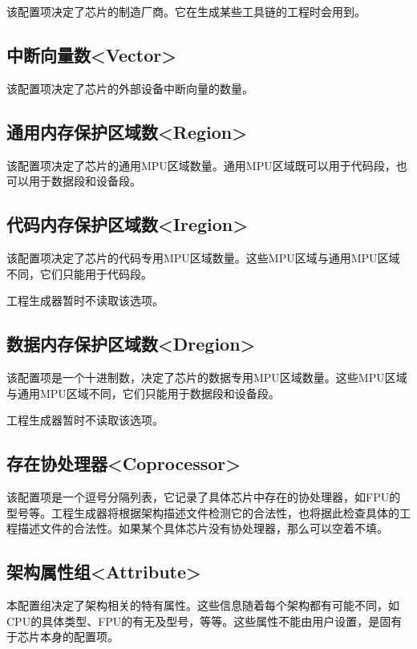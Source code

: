 该配置项决定了芯片的制造厂商。它在生成某些工具链的工程时会用到。

\subsection{中断向量数<Vector>{}}\label{subsec:5-5-6}

该配置项决定了芯片的外部设备中断向量的数量。

\subsection{通用内存保护区域数<Region>{}}\label{subsec:5-5-7}

该配置项决定了芯片的通用MPU区域数量。通用MPU区域既可以用于代码段，也可以用于数据段和设备段。

\subsection{代码内存保护区域数<Iregion>{}}\label{subsec:5-5-8}

该配置项决定了芯片的代码专用MPU区域数量。这些MPU区域与通用MPU区域不同，它们只能用于代码段。

工程生成器暂时不读取该选项。

\subsection{数据内存保护区域数<Dregion>{}}\label{subsec:5-5-9}

该配置项是一个十进制数，决定了芯片的数据专用MPU区域数量。这些MPU区域与通用MPU区域不同，它们只能用于数据段和设备段。

工程生成器暂时不读取该选项。

\subsection{存在协处理器<Coprocessor>{}}\label{subsec:5-5-10}

该配置项是一个逗号分隔列表，它记录了具体芯片中存在的协处理器，如FPU的型号等。工程生成器将根据架构描述文件检测它的合法性，也将据此检查具体的工程描述文件的合法性。如果某个具体芯片没有协处理器，那么可以空着不填。

\subsection{架构属性组<Attribute>{}}\label{subsec:5-5-11}

本配置组决定了架构相关的特有属性。这些信息随着每个架构都有可能不同，如CPU的具体类型、FPU的有无及型号，等等。这些属性不能由用户设置，是固有于芯片本身的配置项。

